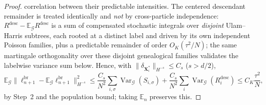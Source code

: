 \documentclass[a4paper,fleqn]{cas-sc}
\theoremstyle{definition}
\theoremstyle{remark}
\begin{document}
\begin{proof}
correlation between their predictable intensities. The centered descendant
remainder is treated identically and \emph{not} by cross-particle independence:
$R^{\mathrm{desc}}-\mathbb E_{\mathcal G}R^{\mathrm{desc}}$ is a sum of compensated
stochastic integrals over \emph{disjoint} Ulam--Harris subtrees, each rooted at a
distinct label and driven by its own independent Poisson families, plus a
predictable remainder of order $O_K(\tau^2/N)$; the same martingale orthogonality
over these disjoint genealogical families validates the labelwise variance sum
below. Hence, with $\|\delta_{\mathbf X^*_i}\|_{H^{-s}}\le C_s$ ($s>d/2$),
\[
\mathbb E_{\mathcal G}\bigl\|\ell^{\mathrm{br}}_{n+1}-\mathbb E_{\mathcal G}\ell^{\mathrm{br}}_{n+1}\bigr\|_{H^{-s}}^2
\le\frac{C_s}{N^2}\sum_{i,\sigma}\operatorname{Var}_{\mathcal G}(S_{i,\sigma})
+\frac{C_s}{N^2}\sum_i\operatorname{Var}_{\mathcal G}(R^{\mathrm{desc}}_i)
\le C_K\frac{\tau^2}{N},
\]
by Step~2 and the population bound; taking $\mathbb E_n$ preserves this.


\end{proof}
\end{document}
